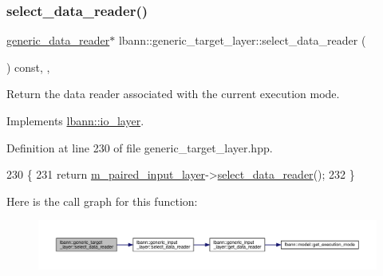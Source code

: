 \subsubsection{\texorpdfstring{select\+\_\+data\+\_\+reader()}{select\_data\_reader()}}
{\footnotesize\ttfamily \hyperlink{classlbann_1_1generic__data__reader}{generic\+\_\+data\+\_\+reader}$\ast$ lbann\+::generic\+\_\+target\+\_\+layer\+::select\+\_\+data\+\_\+reader (\begin{DoxyParamCaption}{ }\end{DoxyParamCaption}) const\hspace{0.3cm}{\ttfamily [inline]}, {\ttfamily [override]}, {\ttfamily [virtual]}}

Return the data reader associated with the current execution mode. 

Implements \hyperlink{classlbann_1_1io__layer_aed46cd991ff11bad08933dc61492e26f}{lbann\+::io\+\_\+layer}.



Definition at line 230 of file generic\+\_\+target\+\_\+layer.\+hpp.


\begin{DoxyCode}
230                                                            \{
231     \textcolor{keywordflow}{return} \hyperlink{classlbann_1_1generic__target__layer_a84da1260e9feb4fbc3e6f2315e4cab4b}{m\_paired\_input\_layer}->\hyperlink{classlbann_1_1generic__input__layer_a9783805369ec7cfe5ce61c81baa5d2e2}{select\_data\_reader}();
232   \}
\end{DoxyCode}
Here is the call graph for this function\+:\nopagebreak
\begin{figure}[H]
\begin{center}
\leavevmode
\includegraphics[width=350pt]{classlbann_1_1generic__target__layer_a9591bdc69e3de9c10fbf71d1faef917a_cgraph}
\end{center}
\end{figure}
\mbox{\label{classlbann_1_1generic__target__layer_a0008630554477f39ad5ec950bf803876}} 
